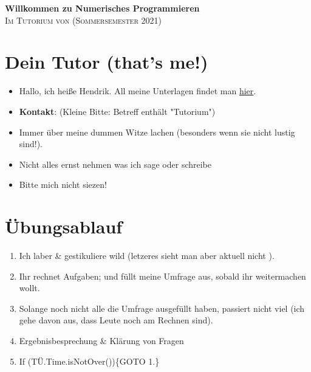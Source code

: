 \documentclass{scrartcl}
\begin{document}
	\pagestyle{empty}
	{\centering
	{\huge\bfseries Willkommen zu Numerisches Programmieren}\\[0.4cm] %
	
	\textsc{\Large Im Tutorium von \npauthor{} (Sommersemester 2021)}\\[0.1cm] %
}


	\section*{Dein Tutor (that's me!)}
	\begin{itemize}
		\item Hallo, ich heiße Hendrik. All meine Unterlagen findet man \href{\npauthorurl}{hier}.
		\item \textbf{Kontakt}: \red{\npauthormail{}} \; (Kleine Bitte: Betreff enthält "Tutorium")
		\item Immer über meine dummen Witze lachen (besonders wenn sie nicht lustig sind!).
		\item Nicht alles ernst nehmen was ich sage oder schreibe \Smiley
		\item Bitte mich nicht siezen!
	\end{itemize}

	\section*{Übungsablauf}
			\begin{enumerate}
				\item Ich laber \& gestikuliere wild (letzeres sieht man aber aktuell nicht \Sadey).
				\item Ihr rechnet Aufgaben; und füllt meine Umfrage aus, sobald ihr weitermachen wollt.
				\item Solange noch nicht alle die Umfrage ausgefüllt haben, passiert nicht viel (ich gehe davon aus, dass Leute noch am Rechnen sind).
				\item Ergebnisbesprechung \& Klärung von Fragen
				\item If (TÜ.Time.isNotOver())\{GOTO 1.\}
			\end{enumerate}
	
\end{document}
